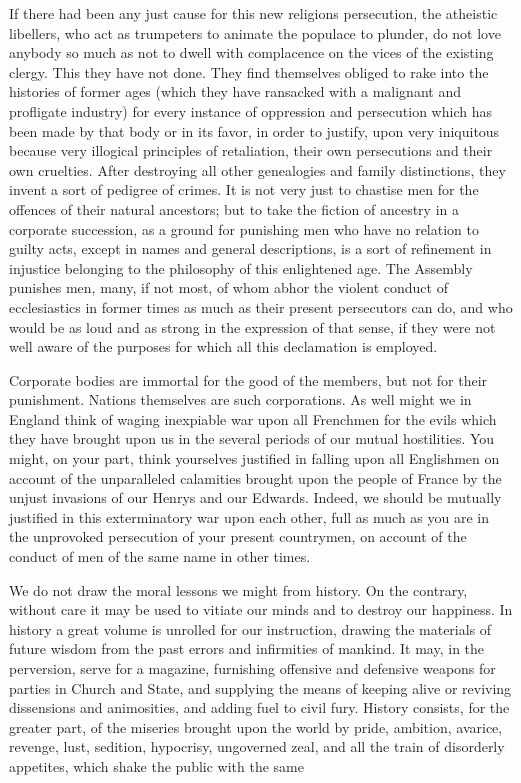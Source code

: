 If there had been any just cause for this new religions persecution, the atheistic libellers, who act as trumpeters to animate the populace to plunder, do not love anybody so much as not to dwell with complacence on the vices of the existing clergy. This they have not done. They find themselves obliged to rake into the histories of former ages (which they have ransacked with a malignant and profligate industry) for every instance of oppression and persecution which has been made by that body or in its favor, in order to justify, upon very iniquitous because very illogical principles of retaliation, their own persecutions and their own cruelties. After destroying all other genealogies and family distinctions, they invent a sort of pedigree of crimes. It is not very just to chastise men for the offences of their natural ancestors; but to take the fiction of ancestry in a corporate succession, as a ground for punishing men who have no relation to guilty acts, except in names and general descriptions, is a sort of refinement in injustice belonging to the philosophy of this enlightened age. The Assembly punishes men, many, if not most, of whom abhor the violent conduct of ecclesiastics in former times as much as their present persecutors can do, and who would be as loud and as strong in the expression of that sense, if they were not well aware of the purposes for which all this declamation is employed.

Corporate bodies are immortal for the good of the members, but not for their punishment. Nations themselves are such corporations. As well might we in England think of waging inexpiable war upon all Frenchmen for the evils which they have brought upon us in the several periods of our mutual hostilities. You might, on your part, think yourselves justified in falling upon all Englishmen on account of the unparalleled calamities brought upon the people of France by the unjust invasions of our Henrys and our Edwards. Indeed, we should be mutually justified in this exterminatory war upon each other, full as much as you are in the unprovoked persecution of your present countrymen, on account of the conduct of men of the same name in other times.

We do not draw the moral lessons we might from history. On the contrary, without care it may be used to vitiate our minds and to destroy our happiness. In history a great volume is unrolled for our instruction, drawing the materials of future wisdom from the past errors and infirmities of mankind. It may, in the perversion, serve for a magazine, furnishing offensive and defensive weapons for parties in Church and State, and supplying the means of keeping alive or reviving dissensions and animosities, and adding fuel to civil fury. History consists, for the greater part, of the miseries brought upon the world by pride, ambition, avarice, revenge, lust, sedition, hypocrisy, ungoverned zeal, and all the train of disorderly appetites, which shake the public with the same

